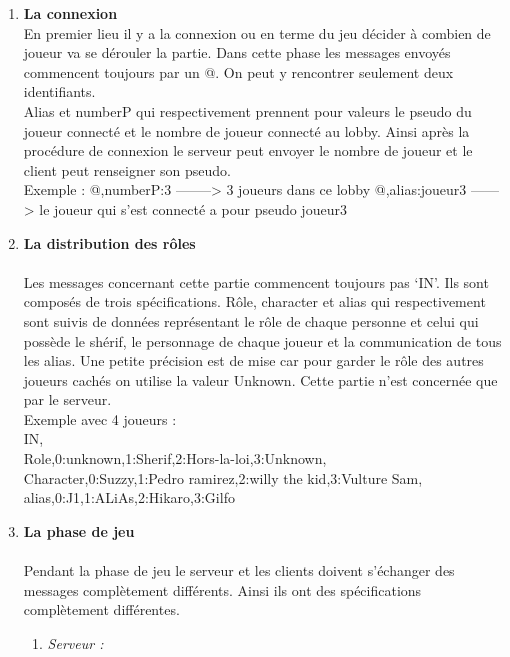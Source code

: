 \documentclass[a4paper,11pt]{article}
\begin{document}
\begin{enumerate}
	\item \textbf{La connexion} \\
	En premier lieu il y a la connexion ou en terme du jeu décider à combien de joueur va se dérouler la partie. Dans cette phase les messages envoyés commencent toujours par un @. On peut y rencontrer seulement deux identifiants. \\
Alias et numberP qui respectivement prennent pour valeurs le pseudo du joueur connecté et le nombre de joueur connecté au lobby. Ainsi après la procédure de connexion le serveur peut envoyer le nombre de joueur et le client peut renseigner son pseudo. \\

Exemple :
@,numberP:3  --------> 3 joueurs dans ce lobby
@,alias:joueur3  ------> le joueur qui s’est connecté a pour pseudo joueur3 \\


	
	\item \textbf{La distribution des rôles} \\\\
	Les messages concernant cette partie commencent toujours pas ‘IN’. Ils sont composés de trois spécifications. Rôle, character et alias qui respectivement sont suivis de données représentant le rôle de chaque personne et celui qui possède le shérif, le personnage de chaque joueur et la communication de tous les alias. Une petite précision est de mise car pour garder le rôle des autres joueurs cachés on utilise la valeur Unknown. Cette partie n’est concernée que par le serveur. \\

Exemple avec 4 joueurs : \\
IN, \\
Role,0:unknown,1:Sherif,2:Hors-la-loi,3:Unknown, \\
Character,0:Suzzy,1:Pedro ramirez,2:willy the kid,3:Vulture Sam, \\
alias,0:J1,1:ALiAs,2:Hikaro,3:Gilfo \\

\newpage

	\item \textbf{La phase de jeu} \\\\
	Pendant la phase de jeu le serveur et les clients doivent s’échanger des messages complètement différents. Ainsi ils ont des spécifications complètement différentes. \\
		\begin{enumerate}[label=(\roman*)]
		\item \textit{Serveur :}\\
		

\end{enumerate}
\end{enumerate}
\end{document}
